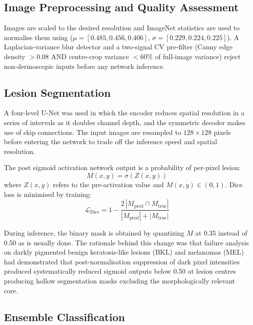 \documentclass[conference]{IEEEtran}
\begin{document}
\subsection{Image Preprocessing and Quality Assessment}

Images are scaled to the desired resolution and ImageNet statistics are used to normalise them using ($\mu{=}[0.485, 0.456, 0.406]$, $\sigma{=}[0.229, 0.224, 0.225]$). A Laplacian-variance blur detector and a two-signal CV pre-filter (Canny edge density $>0.08$ AND centre-crop variance $<60\%$ of full-image variance) reject non-dermoscopic inputs before any network inference.

\subsection{Lesion Segmentation}

A four-level U-Net was used in which the encoder reduces spatial resolution in a series of intervals as it doubles channel depth, and the symmetric decoder makes use of skip connections. The input images are resampled to $128 \times 128$ pixels before entering the network to trade off the inference speed and spatial resolution.

The post sigmoid activation network output is a probability of per-pixel lesion:
\begin{equation}
M(x,y) = \sigma\!\left(Z(x,y)\right)
\end{equation}
where $Z(x,y)$ refers to the pre-activation value and $M(x,y) \in (0,1)$. Dice loss is minimised by training:
\begin{equation}
\mathcal{L}_{\text{Dice}} = 1 - \frac{2\,|M_{\text{pred}} \cap M_{\text{true}}|}{|M_{\text{pred}}| + |M_{\text{true}}|}
\end{equation}

During inference, the binary mask is obtained by quantizing $M$ at 0.35 instead of 0.50 as is usually done. The rationale behind this change was that failure analysis on darkly pigmented benign keratosis-like lesions (BKL) and melanomas (MEL) had demonstrated that post-normalisation suppression of dark pixel intensities produced systematically reduced sigmoid outputs below 0.50 at lesion centres producing hollow segmentation masks excluding the morphologically relevant core.


\subsection{Ensemble Classification}
\end{document}
